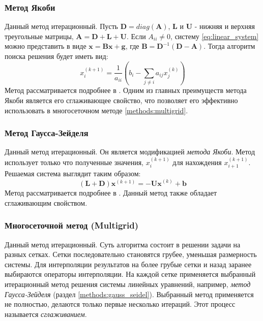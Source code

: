 \subsubsection{Метод Якоби}
Данный метод итерационный. Пусть $\mathbf{D} = diag(\mathbf{A})$, $\mathbf{L}$ и $\mathbf{U}$ - нижняя и верхняя треугольные матрицы, $\mathbf{A} = \mathbf{D} + \mathbf{L} + \mathbf{U}$. Если $A_{ii} \neq 0$, систему \eqref{eq:linear_system} можно представить в виде $\mathbf{x} = \mathbf{Bx} + \mathbf{g}$, где $\mathbf{B} = \mathbf{D}^{-1} (\mathbf{D} - \mathbf{A})$. Тогда алгоритм поиска решения будет иметь вид:
\begin{equation}
x_i^{(k+1)} = \frac{1}{a_{ii}} \left( b_i - \sum_{j \neq i} a_{ij} x_j^{(k)} \right)
\end{equation}
Метод рассматривается подробнее в \cite{Petrov}. Одним из главных преимуществ метода Якоби является его сглаживающее свойство, что позволяет его эффективно использовать в многосеточном методе \ref{methods:multigrid}.

\subsubsection{Метод Гаусса-Зейделя \label{methods:gauss_seidel}}
Данный метод итерационный. Он является модификацией \textit{метода Якоби}. Метод использует только что полученные значения, $x_i^{(k+1)}$ для нахождения $x_{i+1}^{(k+1)}$. Решаемая система выглядит таким образом:
\begin{equation}
(\mathbf{L} + \mathbf{D}) \mathbf{x}^{(k+1)} = -\mathbf{Ux}^{(k)} + \mathbf{b}
\end{equation}
Метод рассматривается подробнее в \cite{Petrov}. Данный метод также обладает сглаживающим свойством.

\subsubsection{Многосеточной метод (Multigrid) \label{methods:multigrid}}
Данный метод итерационный. Суть алгоритма состоит в решении задачи на разных сетках. Сетки последовательно становятся грубее, уменьшая размерность системы. Для интерполяции  результатов на более грубые сетки и назад заранее выбираются операторы интерполяции. На каждой сетке применяется выбранный итерационный метод решения системы линейных уравнений, например, \textit{метод Гаусса-Зейделя} (раздел \ref{methods:gauss_seidel}). Выбранный метод применяется не полностью, делаются только первые несколько итераций. Этот процесс называется \textit{сглаживанием}.
